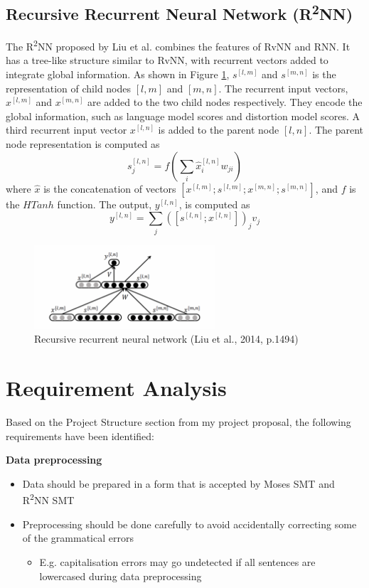\documentclass[12pt,a4paper,twoside,openright]{report}
\begin{document}
\subsection{\texorpdfstring{Recursive Recurrent Neural Network (R\textsuperscript{2}NN)}{Recursive Recurrent Neural Network (R2NN)}}\label{section:r2nn_theory}
The R\textsuperscript{2}NN proposed by Liu et al.\cite{r2nn} combines the features of RvNN and RNN. It has a tree-like structure similar to RvNN, with recurrent vectors added to integrate global information. As shown in Figure \ref{fig:r2nn}, $s^{[l, m]}$ and $s^{[m, n]}$ is the representation of child nodes $[l, m]$ and $[m, n]$. The recurrent input vectors, $x^{[l, m]}$ and $x^{[m, n]}$ are added to the two child nodes respectively. They encode the global information, such as language model scores and distortion model scores. A third recurrent input vector $x^{[l, n]}$ is added to the parent node $[l, n]$. The parent node representation is computed as
\[ s_j^{[l, n]} = f(\sum_{i} \hat{x}_i^{[l, n]}w_{ji}) \]
where $\hat{x}$ is the concatenation of vectors $[x^{[l, m]}; s^{[l, m]}; x^{[m, n]}; s^{[m, n]}]$, and $f$ is the $HTanh$ function. The output, $y^{[l, n]}$, is computed as
\[ y^{[l, n]} = \sum_{j} ([s^{[l, n]}; x^{[l, n]}])_{j}v_j \]


\begin{figure}[ht]
\centering
\includegraphics[width=0.6\textwidth]{images/r2nn.png}
\caption{Recursive recurrent neural network (Liu et al., 2014, p.1494)}
\label{fig:r2nn}
\end{figure}

\section{Requirement Analysis}\label{section:requirement}

Based on the Project Structure section from my project proposal, the following requirements have been identified:

\textbf{Data preprocessing}
\begin{itemize}
    \item Data should be prepared in a form that is accepted by Moses SMT and R\textsuperscript{2}NN SMT
    \item Preprocessing should be done carefully to avoid accidentally correcting some of the grammatical errors 
    
    \begin{itemize}
        \item E.g. capitalisation errors may go undetected if all sentences are lowercased during data preprocessing
    \end{itemize}
\end{itemize}
\end{document}
